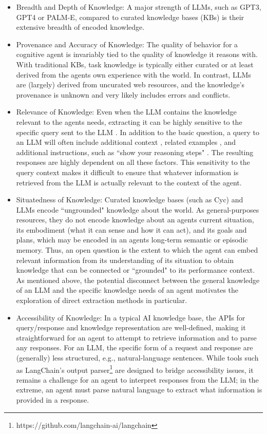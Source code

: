 \documentclass[letterpaper]{article} %
\begin{document}
\begin{itemize}
\item Breadth and Depth of Knowledge: A major strength of LLMs, such as GPT3, GPT4 or PALM-E, compared to curated knowledge bases (KBs) is their extensive breadth of encoded knowledge.
\item Provenance and Accuracy of Knowledge: The quality of behavior for a cognitive agent is invariably tied to the quality of knowledge it reasons with. With traditional KBs, task knowledge is typically either curated or at least derived from the agents own experience with the world. In contrast, LLMs are (largely) derived from uncurated web resources, and the knowledge's provenance is unknown and very likely includes errors and conflicts.
\item Relevance of Knowledge: Even when the LLM contains the knowledge relevant to the agents needs, extracting it can be highly sensitive to the specific query sent to the LLM \cite{pezeshkpour_large_2023}. In addition to the basic question, a query to an LLM will often include additional context \cite{reynolds_prompt_2021}, related examples \cite{brown_language_2020}, and additional instructions, such as ``show your reasoning steps" \cite{wang_self-consistency_2023}. The resulting responses are highly dependent on all these factors. This sensitivity to the query context makes it difficult to ensure that whatever information is retrieved from the LLM is actually relevant to the context of the agent.
\item Situatedness of Knowledge: Curated knowledge bases (such as Cyc) and LLMs encode ``ungrounded" knowledge about the world. As general-purposes resources, they do not encode knowledge about an agents current situation, its embodiment (what it can sense and how it can act), and its goals and plans, which may be encoded in an agents long-term semantic or episodic memory. Thus, an open question is the extent to which the agent can embed relevant information from its understanding of its situation to obtain knowledge that can be connected or ``grounded" to its performance context. As mentioned above, the potential disconnect between the general knowledge of an LLM and the specific knowledge needs of an agent motivates the exploration of direct extraction methods in particular.
\item Accessibility of Knowledge: In a typical AI knowledge base, the APIs for query/response and knowledge representation are well-defined, making it straightforward for an agent to attempt to retrieve information and to parse any responses. For an LLM, the specific form of a request and response are (generally) less structured, e.g., natural-language sentences. While tools such as LangChain's output parser\footnote{https://github.com/langchain-ai/langchain} are designed to bridge accessibility issues, it remains a challenge for an agent to interpret responses from the LLM; in the extreme, an agent must parse natural language to extract what information is provided in a response.

\end{itemize}
\end{document}
